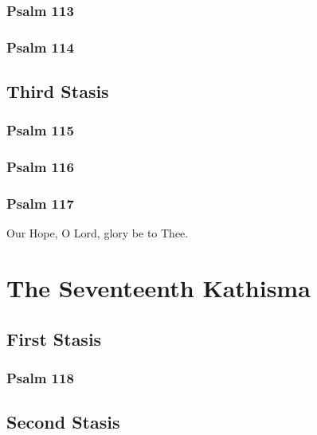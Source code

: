 \documentclass[12pt]{book}
\newcommand{\kathismabreak}{
  \medskip
  \begin{center}
  \begin{footnotesize}
  

  

  

  
  \end{footnotesize}
  \end{center}
  \smallbreak
}
\newcommand{\kathismaend}{
  \medskip
  \begin{center}
  \begin{footnotesize}
  

  

  Our Hope, O Lord, glory be to Thee.
  \end{footnotesize}
  \end{center}
  \smallbreak
}
\begin{document}
\subsubsection{Psalm 113}


\subsubsection{Psalm 114}


\kathismabreak

\subsection{Third Stasis}

\subsubsection{Psalm 115}


\subsubsection{Psalm 116}


\subsubsection{Psalm 117}


\kathismaend

\pagebreak %
\section{The Seventeenth Kathisma}

\subsection{First Stasis}

\subsubsection{Psalm 118}


\kathismabreak

\subsection{Second Stasis}
\end{document}
